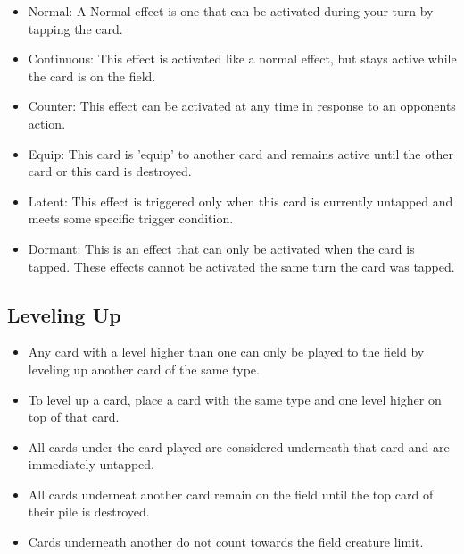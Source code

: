 \begin{itemize}
\begin{itemize}
        \item Normal: A Normal effect is one that can be activated during your turn by tapping the card.
        \item Continuous: This effect is activated like a normal effect, but stays active while the card is on the field.
		\item Counter: This effect can be activated at any time in response to an opponents action.
		\item Equip: This card is 'equip' to another card and remains active until the other card or this card is destroyed.
		\item Latent: This effect is triggered only when this card is currently untapped and meets some specific trigger condition. 
		\item Dormant: This is an effect that can only be activated when the card is tapped. These effects cannot be activated the same turn the card was tapped.
    \end{itemize}
\end{itemize}








\subsection{Leveling Up}
\begin{itemize}
    \item Any card with a level higher than one can only be played to the field by leveling up another card of the same type.
    \item To level up a card, place a card with the same type and one level higher on top of that card.
    \item All cards under the card played are considered underneath that card and are immediately untapped.
    \item All cards underneat another card remain on the field until the top card of their pile is destroyed.
    \item Cards underneath another do not count towards the field creature limit.
\end{itemize}








